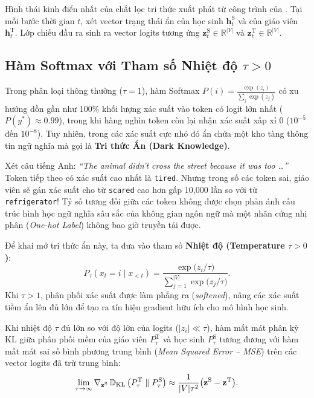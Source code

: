 Hình thái kinh điển nhất của chắt lọc tri thức xuất phát từ công trình của \citet{hinton2015distilling}.
Tại mỗi bước thời gian $t$, xét vector trạng thái ẩn của học sinh $\mathbf{h}_t^{\text{S}}$ và của giáo viên $\mathbf{h}_t^{\text{T}}$. Lớp chiếu đầu ra sinh ra vector logits tương ứng $\mathbf{z}_t^{\text{S}} \in \mathbb{R}^{|V|}$ và $\mathbf{z}_t^{\text{T}} \in \mathbb{R}^{|V|}$.

\subsection{Hàm Softmax với Tham số Nhiệt độ $\tau > 0$}
Trong phân loại thông thường ($\tau = 1$), hàm Softmax $P(i) = \frac{\exp(z_i)}{\sum_j \exp(z_j)}$ có xu hướng dồn gần như $100\%$ khối lượng xác suất vào token có logit lớn nhất ($P(y^*) \approx 0.99$), trong khi hàng nghìn token còn lại nhận xác suất xấp xỉ $0$ ($10^{-5}$ đến $10^{-8}$).
Tuy nhiên, trong các xác suất cực nhỏ đó ẩn chứa một kho tàng thông tin ngữ nghĩa mà \citet{hinton2015distilling} gọi là \textbf{Tri thức Ẩn (Dark Knowledge)}.

\begin{example}
Xét câu tiếng Anh: \textit{``The animal didn't cross the street because it was too \dots''}
Token tiếp theo có xác suất cao nhất là \texttt{tired}. Nhưng trong số các token sai, giáo viên sẽ gán xác suất cho từ \texttt{scared} cao hơn gấp 10,000 lần so với từ \texttt{refrigerator}! Tỷ số tương đối giữa các token không được chọn phản ánh cấu trúc hình học ngữ nghĩa sâu sắc của không gian ngôn ngữ mà một nhãn cứng nhị phân (\textit{One-hot Label}) không bao giờ truyền tải được.
\end{example}

Để khai mở tri thức ẩn này, ta đưa vào tham số \textbf{Nhiệt độ (Temperature $\tau > 0$)}:
\begin{equation}
    P_\tau(x_t = i \mid x_{<t}) = \frac{\exp\big(z_i / \tau\big)}{\sum_{j=1}^{|V|} \exp\big(z_j / \tau\big)}.
    \label{eq:softmax_temperature}
\end{equation}
Khi $\tau > 1$, phân phối xác suất được làm phẳng ra (\textit{softened}), nâng các xác suất tiềm ẩn lên đủ lớn để tạo ra tín hiệu gradient hữu ích cho mô hình học sinh.

\begin{theorem}
Khi nhiệt độ $\tau$ đủ lớn so với độ lớn của logits ($|z_i| \ll \tau$), hàm mất mát phân kỳ KL giữa phân phối mềm của giáo viên $P_\tau^{\text{T}}$ và học sinh $P_\tau^{\text{S}}$ tương đương với hàm mất mát sai số bình phương trung bình (\textit{Mean Squared Error -- MSE}) trên các vector logits đã trừ trung bình:
\begin{equation}
    \lim_{\tau \to \infty} \nabla_{\mathbf{z}^{\text{S}}} \operatorname{\mathbb{D}_{\mathrm{KL}}}\big(P_\tau^{\text{T}} \parallel P_\tau^{\text{S}}\big) \approx \frac{1}{|V|\tau^2} \big(\mathbf{z}^{\text{S}} - \mathbf{z}^{\text{T}}\big).
\end{equation}
\end{theorem}

